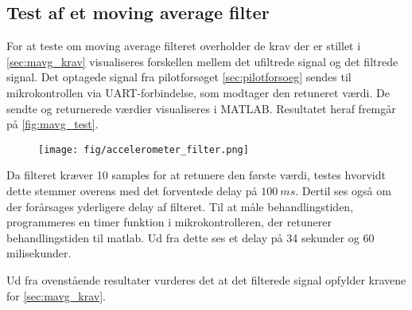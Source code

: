 \subsection{Test af et moving average filter}
For at teste om moving average filteret overholder de krav der er stillet i \autoref{sec:mavg_krav} visualiseres forskellen mellem det ufiltrede signal og det filtrede signal. Det optagede signal fra pilotforsøget \autoref{sec:pilotforsoeg} sendes til mikrokontrollen via UART-forbindelse, som modtager den retuneret værdi. De sendte og returnerede værdier visualiseres i MATLAB. Resultatet heraf fremgår på \autoref{fig:mavg_test}. 

\begin{figure}[H]
	\centering
	\texttt{[image: fig/accelerometer\_filter.png]}
	\caption{ }
	\label{fig:mavg_test}
\end{figure}


Da filteret kræver 10 samples for at retunere den første værdi, testes hvorvidt dette stemmer overens med det forventede delay på $100~ms$. Dertil ses også om der forårsages yderligere delay af filteret. Til at måle behandlingstiden, programmeres en timer funktion i mikrokontrolleren, der retunerer behandlingstiden til matlab. Ud fra dette ses et delay på 34 sekunder og 60 milisekunder.

Ud fra ovenstående resultater vurderes det at det filterede signal opfylder kravene for \autoref{sec:mavg_krav}. 